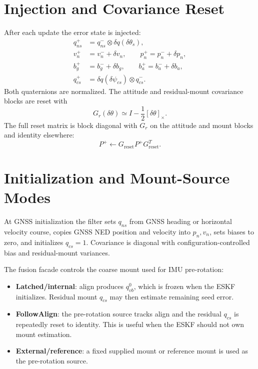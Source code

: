 \documentclass[11pt]{article}
\newcommand{\T}{^{T}}
\newcommand{\crossmat}[1]{\left[#1\right]_\times}
\newcommand{\dq}{\delta q}
\begin{document}
\section{Injection and Covariance Reset}

After each update the error state is injected:
\begin{align}
  q_{ns}^{+} &= q_{ns}^{-}\otimes\dq(\delta\theta_s),\\
  v_n^{+} &= v_n^{-}+\delta v_n,\qquad
  p_n^{+}=p_n^{-}+\delta p_n,\\
  b_g^{+} &= b_g^{-}+\delta b_g,\qquad
  b_a^{+}=b_a^{-}+\delta b_a,\\
  q_{cs}^{+} &= \dq(\delta\psi_{cs})\otimes q_{cs}^{-}.
\end{align}
Both quaternions are normalized. The attitude and residual-mount covariance
blocks are reset with
\begin{equation}
  G_r(\delta\theta)\simeq I-\frac{1}{2}\crossmat{\delta\theta}.
\end{equation}
The full reset matrix is block diagonal with \(G_r\) on the attitude and mount
blocks and identity elsewhere:
\begin{equation}
  P^{+}\leftarrow G_{\mathrm{reset}}P^{+}G_{\mathrm{reset}}\T .
\end{equation}

\section{Initialization and Mount-Source Modes}

At GNSS initialization the filter sets \(q_{ns}\) from GNSS heading or horizontal
velocity course, copies GNSS NED position and velocity into \(p_n,v_n\), sets
biases to zero, and initializes \(q_{cs}=1\). Covariance is diagonal with
configuration-controlled bias and residual-mount variances.

The fusion facade controls the coarse mount used for IMU pre-rotation:
\begin{itemize}[leftmargin=1.5em]
\item \textbf{Latched/internal}: align produces \(q_{vb}^{0}\), which is frozen
when the ESKF initializes. Residual mount \(q_{cs}\) may then estimate remaining
seed error.
\item \textbf{FollowAlign}: the pre-rotation source tracks align and the
residual \(q_{cs}\) is repeatedly reset to identity. This is useful when the
ESKF should not own mount estimation.
\item \textbf{External/reference}: a fixed supplied mount or reference mount is
used as the pre-rotation source.
\end{itemize}
\end{document}
